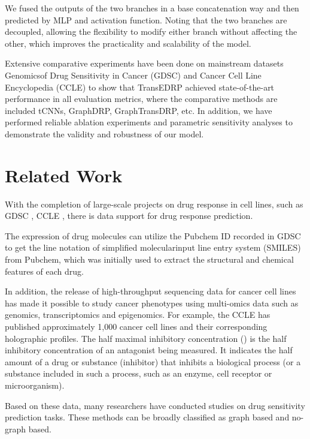 \documentclass{article}
\begin{document}
We fused the outputs of the two branches in a base concatenation way and then predicted  by MLP and activation function. Noting that the two branches are decoupled, allowing the flexibility to modify either branch without affecting the other, which improves the practicality and scalability of the model.

Extensive comparative experiments have been done on mainstream datasets Genomicsof Drug Sensitivity in Cancer (GDSC) \cite{GDSC} and Cancer Cell Line Encyclopedia (CCLE) \cite{CCLE} to show that TransEDRP achieved state-of-the-art performance in all evaluation metrics, where the comparative methods are included tCNNs, GraphDRP, GraphTransDRP, etc. In addition, we have performed reliable ablation experiments and parametric sensitivity analyses to demonstrate the validity and robustness of our model. 








\section{Related Work}

With the completion of large-scale projects on drug response in cell lines, such as GDSC \cite{GDSC}, CCLE \cite{CCLE}, there is data support for drug response prediction.

The expression of drug molecules can utilize the Pubchem ID recorded in GDSC to get the line notation of simplified molecularinput line entry system (SMILES) from Pubchem, which was initially used to extract the structural and chemical features of each drug.

In addition, the release of high-throughput sequencing data for cancer cell lines has made it possible to study cancer phenotypes using multi-omics data such as genomics, transcriptomics and epigenomics. For example, the CCLE has published approximately 1,000 cancer cell lines and their corresponding holographic profiles. The half maximal inhibitory concentration () is the half inhibitory concentration of an antagonist being measured. It indicates the half amount of a drug or substance (inhibitor) that inhibits a biological process (or a substance included in such a process, such as an enzyme, cell receptor or microorganism).





Based on these data, many researchers have conducted studies on drug sensitivity prediction tasks. These methods can be broadly classified as graph based and no-graph based.
\end{document}
